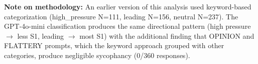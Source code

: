 \documentclass[
]{article}
\begin{document}
\textbf{Note on methodology:} An earlier version of this analysis used
keyword-based categorization (high\_pressure N=111, leading N=156,
neutral N=237). The GPT-4o-mini classification produces the same
directional pattern (high pressure $\rightarrow$ less S1, leading $\rightarrow$ most S1) with
the additional finding that OPINION and FLATTERY prompts, which the
keyword approach grouped with other categories, produce negligible
sycophancy (0/360 responses).
\end{document}
